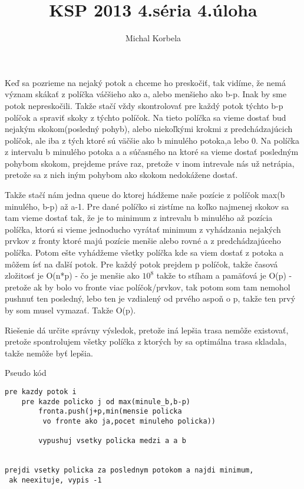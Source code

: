 \documentclass[a4paper,11pt]{article}
\title{KSP 2013 4.séria 4.úloha}
\author{Michal Korbela}
\begin{document}
Keď sa pozrieme na nejaký potok a chceme ho preskočiť, tak vidíme, že nemá význam skákať z políčka váčšieho ako a, alebo menšieho ako b-p. Inak by sme potok nepreskočili. Takže stačí vždy skontrolovať pre každý potok týchto b-p políčok a spraviť skoky z týchto políčok. Na tieto políčka sa vieme dostať bud nejakým skokom(posledný pohyb), alebo niekoľkými krokmi z predchádzajúcich políčok, ale iba z tých ktoré sú väčšie ako b minulého potoka,a lebo 0. Na políčka z intervalu b minulého potoka a a súčasného na ktoré sa vieme dostať posledným pohybom skokom, prejdeme práve raz, pretože v inom intrevale nás už netrápia, pretože sa z nich iným pohybom ako skokom nedokážene dostať.

Takže stačí nám jedna queue do ktorej hádžeme naše pozície z políčok max(b minulého, b-p) až a-1. Pre dané políčko si zistíme na koľko najmenej skokov sa tam vieme dostať tak, že je to minimum z intrevalu b minulého až pozícia políčka, ktorú si vieme jednoducho vyrátať minimum z vyhádzania nejakých prvkov z fronty ktoré majú pozície menšie alebo rovné a z predchádzajúceho políčka.
Potom ešte vyhádžeme všetky políčka kde sa viem dostať z potoka a môžem ísť na ďalší potok.
Pre každý potok prejdem p políčok, takže časová zložitosť je O(n*p) - čo je menšie ako $10^8$ takže to stíham a pamäťová je O(p) - pretože ak by bolo vo fronte viac políčok/prvkov, tak potom som tam nemohol pushnuť ten posledný, lebo ten je vzdialený od prvého aspoň o p, takže ten prvý by som musel vymazať. Takže O(p).

Riešenie dá určite správny výsledok, pretože iná lepšia trasa nemôže existovať, pretože spontrolujem všetky políčka z ktorých by sa optimálna trasa skladala, takže nemôže byť lepšia.

Pseudo kód

\begin{lstlisting}
pre kazdy potok i
	pre kazde policko j od max(minule_b,b-p)
		fronta.push(j+p,min(mensie policka
		 vo fronte ako ja,pocet minuleho policka))
		
		vypushuj vsetky policka medzi a a b
		

prejdi vsetky policka za poslednym potokom a najdi minimum,
 ak neexituje, vypis -1
		

\end{lstlisting}
\end{document}
